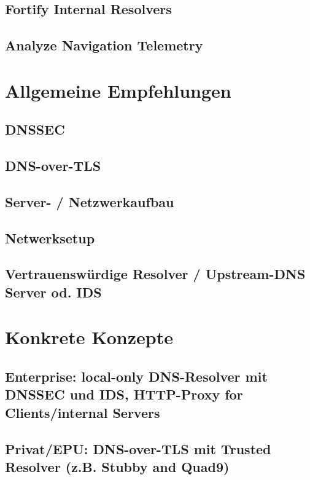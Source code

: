\subsection{Fortify Internal Resolvers}

\subsection{Analyze Navigation Telemetry}

\section{Allgemeine Empfehlungen}

\subsection{DNSSEC}

\subsection{DNS-over-TLS}
\subsection{Server- / Netzwerkaufbau}
\subsection{Netwerksetup}
\subsection{Vertrauenswürdige Resolver / Upstream-DNS Server od. IDS}

\begin{comment}
*Nur mit entsprechender Validierung des Zeilservers (DoT, etc.) weil sonst anfällig auf MitM, BGP-Hijacking, usw.*
\end{comment}

\section{Konkrete Konzepte}

\subsection{Enterprise: local-only DNS-Resolver mit DNSSEC und IDS, HTTP-Proxy for Clients/internal Servers}

\subsection{Privat/EPU: DNS-over-TLS  mit Trusted Resolver (z.B. Stubby and Quad9)}
